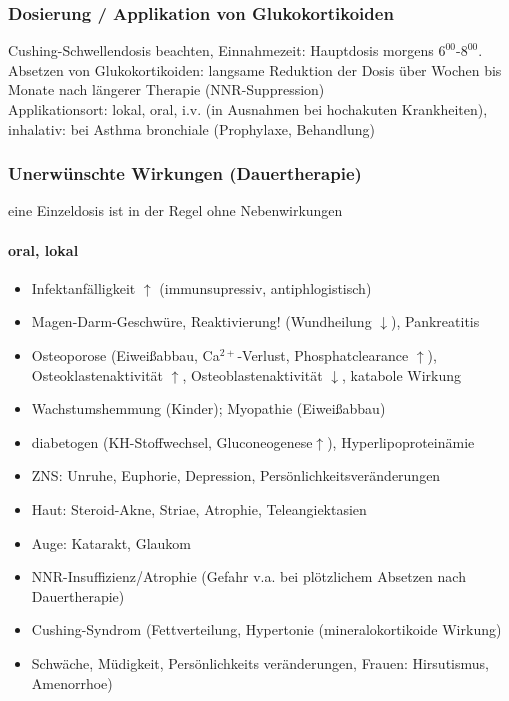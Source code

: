 \documentclass[10pt,a4paper]{report}
\begin{document}
\subsubsection{Dosierung / Applikation von Glukokortikoiden} %
\label{par:dosierung_applikation_von_glukokortikoiden}
Cushing-Schwellendosis beachten, Einnahmezeit: Hauptdosis morgens $6^{00}$-$8^{00}$.
Absetzen von Glukokortikoiden: langsame Reduktion der Dosis über Wochen bis Monate nach längerer Therapie (NNR-Suppression)\\
Applikationsort:  lokal, oral,  i.v. (in Ausnahmen bei hochakuten Krankheiten), inhalativ: bei Asthma bronchiale (Prophylaxe, Behandlung)
\subsubsection{Unerwünschte Wirkungen (Dauertherapie) } %
\label{par:unerw_nschte_wirkungen_dauertherapie_}
eine Einzeldosis ist in der Regel ohne Nebenwirkungen
\paragraph{oral, lokal} %
\label{subp:oral_lokal}
\begin{itemize}
	\item Infektanfälligkeit $\uparrow$ (immunsupressiv, antiphlogistisch)
	\item Magen-Darm-Geschwüre, Reaktivierung! (Wundheilung $\downarrow$), Pankreatitis
	\item Osteoporose (Eiweißabbau, Ca$^{2+}$-Verlust, Phosphatclearance $\uparrow$),   
	Osteoklastenaktivität $\uparrow$, Osteoblastenaktivität $\downarrow$, katabole Wirkung
	\item Wachstumshemmung (Kinder); Myopathie (Eiweißabbau)
	\item diabetogen (KH-Stoffwechsel, Gluconeogenese$\uparrow$), Hyperlipoproteinämie
	\item ZNS: Unruhe, Euphorie, Depression, Persönlichkeitsveränderungen
	\item Haut: Steroid-Akne, Striae, Atrophie, Teleangiektasien
	\item Auge: Katarakt, Glaukom
	\item NNR-Insuffizienz/Atrophie (Gefahr v.a. bei plötzlichem Absetzen nach Dauertherapie)
	\item Cushing-Syndrom (Fettverteilung, Hypertonie (mineralokortikoide Wirkung)
	\item Schwäche, Müdigkeit, Persönlichkeits veränderungen, Frauen: Hirsutismus, Amenorrhoe)
\end{itemize}
\end{document}
